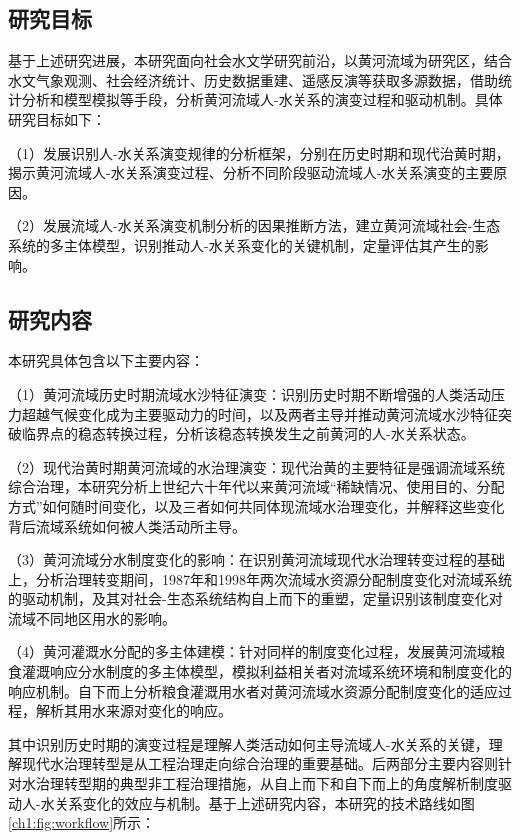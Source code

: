 
\subsection{研究目标}
基于上述研究进展，本研究面向社会水文学研究前沿，以黄河流域为研究区，结合水文气象观测、社会经济统计、历史数据重建、遥感反演等获取多源数据，借助统计分析和模型模拟等手段，分析黄河流域人-水关系的演变过程和驱动机制。具体研究目标如下：

（1）发展识别人-水关系演变规律的分析框架，分别在历史时期和现代治黄时期，揭示黄河流域人-水关系演变过程、分析不同阶段驱动流域人-水关系演变的主要原因。

（2）发展流域人-水关系演变机制分析的因果推断方法，建立黄河流域社会-生态系统的多主体模型，识别推动人-水关系变化的关键机制，定量评估其产生的影响。


\subsection{研究内容}

本研究具体包含以下主要内容：

（1）黄河流域历史时期流域水沙特征演变：识别历史时期不断增强的人类活动压力超越气候变化成为主要驱动力的时间，以及两者主导并推动黄河流域水沙特征突破临界点的稳态转换过程，分析该稳态转换发生之前黄河的人-水关系状态。

（2）现代治黄时期黄河流域的水治理演变：现代治黄的主要特征是强调流域系统综合治理，本研究分析上世纪六十年代以来黄河流域“稀缺情况、使用目的、分配方式”如何随时间变化，以及三者如何共同体现流域水治理变化，并解释这些变化背后流域系统如何被人类活动所主导。

（3）黄河流域分水制度变化的影响：在识别黄河流域现代水治理转变过程的基础上，分析治理转变期间，1987年和1998年两次流域水资源分配制度变化对流域系统的驱动机制，及其对社会-生态系统结构自上而下的重塑，定量识别该制度变化对流域不同地区用水的影响。

（4）黄河灌溉水分配的多主体建模：针对同样的制度变化过程，发展黄河流域粮食灌溉响应分水制度的多主体模型，模拟利益相关者对流域系统环境和制度变化的响应机制。自下而上分析粮食灌溉用水者对黄河流域水资源分配制度变化的适应过程，解析其用水来源对变化的响应。

其中识别历史时期的演变过程是理解人类活动如何主导流域人-水关系的关键，理解现代水治理转型是从工程治理走向综合治理的重要基础。后两部分主要内容则针对水治理转型期的典型非工程治理措施，从自上而下和自下而上的角度解析制度驱动人-水关系变化的效应与机制。基于上述研究内容，本研究的技术路线如图\ref{ch1:fig:workflow}所示：

